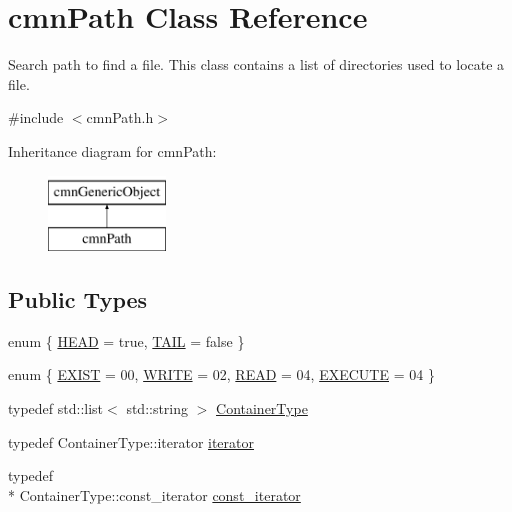 \hypertarget{classcmn_path}{\section{cmn\-Path Class Reference}
\label{classcmn_path}
}


Search path to find a file. This class contains a list of directories used to locate a file.  




{\ttfamily \#include $<$cmn\-Path.\-h$>$}

Inheritance diagram for cmn\-Path\-:\begin{figure}[H]
\begin{center}
\leavevmode
\includegraphics[height=2.000000cm]{da/d62/classcmn_path}
\end{center}
\end{figure}
\subsection*{Public Types}
\begin{DoxyCompactItemize}
\item 
enum \{ \hyperlink{classcmn_path_ac052729bcebb4fcdcef7eaaa81c21ab9a53c54bb785ea4ed82a051ce4508f152a}{H\-E\-A\-D} = true, 
\hyperlink{classcmn_path_ac052729bcebb4fcdcef7eaaa81c21ab9ae473342fccc1ae9e6812eb4e3c192352}{T\-A\-I\-L} = false
 \}
\item 
enum \{ \hyperlink{classcmn_path_a15dacf9562d80d5b7eb9b849726e768ca3f33be1cfafa854340d04aa7451978f8}{E\-X\-I\-S\-T} = 00, 
\hyperlink{classcmn_path_a15dacf9562d80d5b7eb9b849726e768caaacc5c06046553f65d493b0b02c1421c}{W\-R\-I\-T\-E} = 02, 
\hyperlink{classcmn_path_a15dacf9562d80d5b7eb9b849726e768caea0bb09a4a02da90f6c172531cd17a05}{R\-E\-A\-D} = 04, 
\hyperlink{classcmn_path_a15dacf9562d80d5b7eb9b849726e768cace4ec4b7133df9a67040ee7de03499fa}{E\-X\-E\-C\-U\-T\-E} = 04
 \}
\item 
typedef std\-::list$<$ std\-::string $>$ \hyperlink{classcmn_path_aa5870e72f7b99998f414021e28fe80a9}{Container\-Type}
\end{DoxyCompactItemize}
{\bf }\par
\begin{DoxyCompactItemize}
\item 
typedef Container\-Type\-::iterator \hyperlink{classcmn_path_a58a2a202a8ed8c65abb90be592724341}{iterator}
\item 
typedef \\*
Container\-Type\-::const\-\_\-iterator \hyperlink{classcmn_path_a9e313220d7a856280a1dff97d73c61f8}{const\-\_\-iterator}
\end{DoxyCompactItemize}

